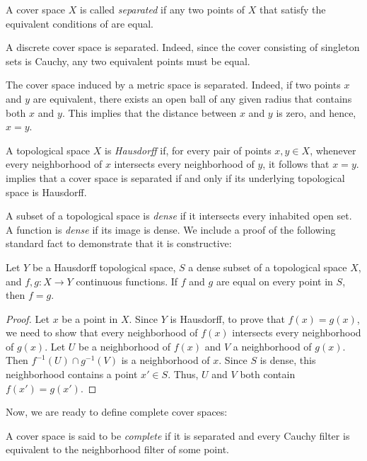 \documentclass[reqno]{amsart}
\theoremstyle{definition}
\theoremstyle{remark}
\numberwithin{figure}{section}
\begin{document}
\begin{defn}
A cover space $X$ is called \emph{separated} if any two points of $X$ that satisfy the equivalent conditions of  are equal.
\end{defn}

\begin{example}
A discrete cover space is separated.
Indeed, since the cover consisting of singleton sets is Cauchy, any two equivalent points must be equal.
\end{example}

\begin{example}
The cover space induced by a metric space is separated.
Indeed, if two points $x$ and $y$ are equivalent, there exists an open ball of any given radius that contains both $x$ and $y$.
This implies that the distance between $x$ and $y$ is zero, and hence, $x = y$.
\end{example}

A topological space $X$ is \emph{Hausdorff} if, for every pair of points $x,y \in X$, whenever every neighborhood of $x$ intersects every neighborhood of $y$, it follows that $x = y$.
 implies that a cover space is separated if and only if its underlying topological space is Hausdorff.

A subset of a topological space is \emph{dense} if it intersects every inhabited open set.
A function is \emph{dense} if its image is dense.
We include a proof of the following standard fact to demonstrate that it is constructive:

\begin{prop}
Let $Y$ be a Hausdorff topological space, $S$ a dense subset of a topological space $X$, and $f,g : X \to Y$ continuous functions.
If $f$ and $g$ are equal on every point in $S$, then $f = g$.
\end{prop}
\begin{proof}
Let $x$ be a point in $X$.
Since $Y$ is Hausdorff, to prove that $f(x) = g(x)$, we need to show that every neighborhood of $f(x)$ intersects every neighborhood of $g(x)$.
Let $U$ be a neighborhood of $f(x)$ and $V$ a neighborhood of $g(x)$.
Then $f^{-1}(U) \cap g^{-1}(V)$ is a neighborhood of $x$.
Since $S$ is dense, this neighborhood contains a point $x' \in S$.
Thus, $U$ and $V$ both contain $f(x') = g(x')$.
\end{proof}

Now, we are ready to define complete cover spaces:

\begin{defn}
A cover space is said to be \emph{complete} if it is separated and every Cauchy filter is equivalent to the neighborhood filter of some point.
\end{defn}
\end{document}
